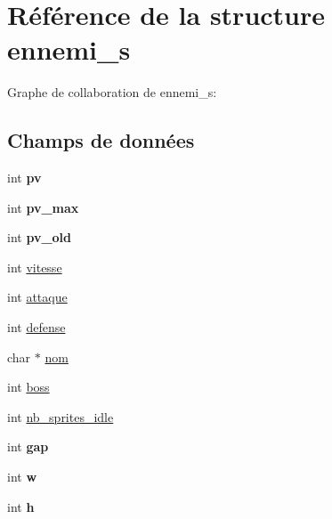 \hypertarget{structennemi__s}{}\section{Référence de la structure ennemi\+\_\+s}
\label{structennemi__s}


Graphe de collaboration de ennemi\+\_\+s\+:
\subsection*{Champs de données}
\begin{DoxyCompactItemize}
\item 
\mbox{\label{structennemi__s_acced51b66bf14056583ddbe794fcc2e3}} 
int {\bfseries pv}
\item 
\mbox{\label{structennemi__s_aafa773809185c36ab5b23b6fa63c45f6}} 
int {\bfseries pv\+\_\+max}
\item 
\mbox{\label{structennemi__s_a0cd3f5caadd346d1f43e3080f716a58f}} 
int {\bfseries pv\+\_\+old}
\item 
int \hyperlink{structennemi__s_a2209ba506bbe6b6bfba8434837deba28}{vitesse}
\item 
int \hyperlink{structennemi__s_a1b3d60dde3acf89c6ba6ae2c250109e2}{attaque}
\item 
int \hyperlink{structennemi__s_a8e04831164889e636a03551f33167ac9}{defense}
\item 
char $\ast$ \hyperlink{structennemi__s_a0928cbeee6295b778f04976ef3bd7e03}{nom}
\item 
int \hyperlink{structennemi__s_a38a4d8c90aba3e83b1d13fbef1613e6a}{boss}
\item 
int \hyperlink{structennemi__s_acab1561fdaa24a1e81787be81e0adbb8}{nb\+\_\+sprites\+\_\+idle}
\item 
\mbox{\label{structennemi__s_a6b7dfdd9c45bb31dc86212bc8e02f663}} 
int {\bfseries gap}
\item 
\mbox{\label{structennemi__s_a6a2d8f4a780eb88a1d76e70bcb1e52af}} 
int {\bfseries w}
\item 
\mbox{\label{structennemi__s_a81823eaadc7d4d4c51e75b78e71d96ca}} 
int {\bfseries h}
\item 

\end{DoxyCompactItemize}
